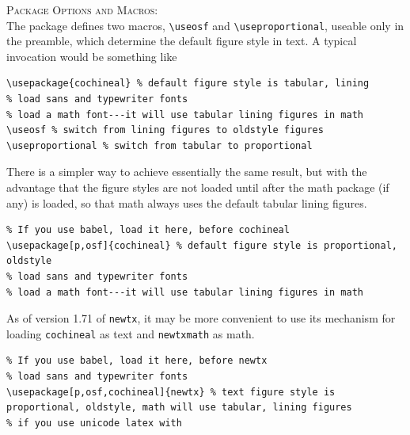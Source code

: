 \documentclass[11pt]{article}
\begin{document}
\textsc{Package Options and Macros:}\\
The package defines two macros, \verb|\useosf| and \verb|\useproportional|, useable only in the preamble, which determine the default figure style in text. A typical invocation would be something like
\begin{verbatim}
\usepackage{cochineal} % default figure style is tabular, lining
% load sans and typewriter fonts
% load a math font---it will use tabular lining figures in math
\useosf % switch from lining figures to oldstyle figures
\useproportional % switch from tabular to proportional
\end{verbatim}
There is a simpler way to achieve essentially the same result, but with the advantage that the figure styles are not loaded until after the math package (if any) is loaded, so that math always uses the default tabular lining figures. 
\begin{verbatim}
% If you use babel, load it here, before cochineal
\usepackage[p,osf]{cochineal} % default figure style is proportional, oldstyle
% load sans and typewriter fonts
% load a math font---it will use tabular lining figures in math
\end{verbatim}

As of version 1.71 of {\tt newtx}, it may be more convenient to use its mechanism for loading {\tt cochineal} as text and {\tt newtxmath} as math.
\begin{verbatim}
% If you use babel, load it here, before newtx
% load sans and typewriter fonts
\usepackage[p,osf,cochineal]{newtx} % text figure style is proportional, oldstyle, math will use tabular, lining figures
% if you use unicode latex with 
\end{verbatim}
\end{document}
